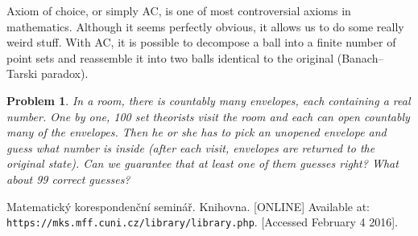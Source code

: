 \documentclass[11pt,a5paper]{article}
\newtheorem{problem}{Problem}
\begin{document}
\noindent Axiom of choice, or simply AC, is one of most controversial axioms in mathematics. Although it seems perfectly obvious, it allows us to do some really weird stuff. With AC, it is possible to decompose a ball into a finite number of point sets and reassemble it into two balls identical to the original (Banach–Tarski paradox). 

\begin{problem}
In a room, there is countably many envelopes, each containing a real number. One by one, 100 set theorists visit the room and each can open countably many of the envelopes. Then he or she has to pick an unopened envelope and guess what number is inside (after each visit, envelopes are returned to the original state). Can we guarantee that at least one of them guesses right? What about 99 correct guesses?
\end{problem}


\begin{thebibliography}{9}
 Matematický korespondenční seminář. Knihovna. [ONLINE] Available at: \texttt{https://mks.mff.cuni.cz/library/library.php}. [Accessed February 4 2016].
\end{thebibliography}
\end{document}
